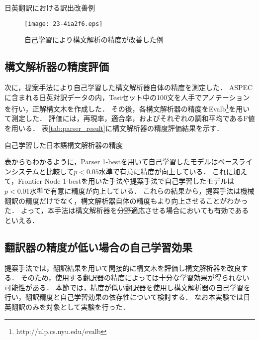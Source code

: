 \documentclass[japanese]{jnlp_1.4}
\begin{document}
\begin{table}[t]
\caption{日英翻訳における訳出改善例}
\label{tab:ex_better_trans}

\vspace{0.5\Cvs}
\end{table}

\begin{figure}[t]
\begin{center}
\texttt{[image: 23-4ia2f6.eps]}
\end{center}
\caption{自己学習により構文解析の精度が改善した例} \label{fig:selftrain_tree}
\end{figure}


\subsection{構文解析器の精度評価}
\label{sec:parser_eval}

次に，提案手法により自己学習した構文解析器自体の精度を測定した．
ASPECに含まれる日英対訳データの内，Testセット中の100文を人手でアノテーションを行い，正解構文木を作成した．
その後，各構文解析器の精度をEvalb\footnote{http://nlp.cs.nyu.edu/evalb}を用いて測定した．
評価には，再現率，適合率，およびそれぞれの調和平均であるF値を用いる．
表\ref{tab:parser_result}に構文解析器の精度評価結果を示す．

\begin{table}[t] 
\caption{自己学習した日本語構文解析器の精度}
\label{tab:parser_result}

\end{table}

表からもわかるように，Parser 1-bestを用いて自己学習したモデルはベースラインシステムと比較して$p<0.05$水準で有意に精度が向上している．
これに加えて，Frontier Node 1-bestを用いた手法や提案手法で自己学習したモデルは$p<0.01$水準で有意に精度が向上している．
これらの結果から，提案手法は機械翻訳の精度だけでなく，構文解析器自体の精度もより向上させることがわかった．
よって，本手法は構文解析器を分野適応させる場合においても有効であるといえる．


\subsection{翻訳器の精度が低い場合の自己学習効果}

提案手法では，翻訳結果を用いて間接的に構文木を評価し構文解析器を改良する．
そのため，使用する翻訳器の精度によっては十分な学習効果が得られない可能性がある．
本節では，精度が低い翻訳器を使用し構文解析器の自己学習を行い，翻訳精度と自己学習効果の依存性について検討する．
なお本実験では日英翻訳のみを対象として実験を行った．
\end{document}
